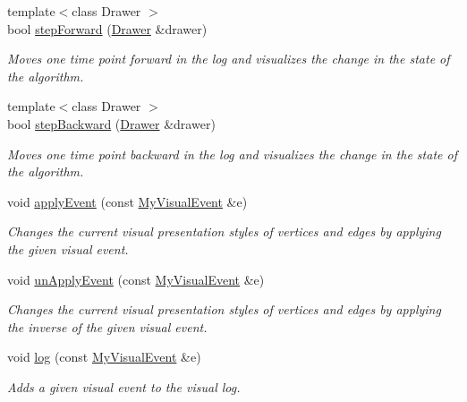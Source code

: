 \begin{DoxyCompactItemize}
\item 
{\footnotesize template$<$class Drawer $>$ }\\bool \hyperlink{structVisualLog_a544b2c0b0840710700afb2ff208e7242}{step\+Forward} (\hyperlink{structDrawer}{Drawer} \&drawer)
\begin{DoxyCompactList}\small\item\em Moves one time point forward in the log and visualizes the change in the state of the algorithm. \end{DoxyCompactList}\item 
{\footnotesize template$<$class Drawer $>$ }\\bool \hyperlink{structVisualLog_a00f3f363a706173f91d58b020fc24efa}{step\+Backward} (\hyperlink{structDrawer}{Drawer} \&drawer)
\begin{DoxyCompactList}\small\item\em Moves one time point backward in the log and visualizes the change in the state of the algorithm. \end{DoxyCompactList}\item 
void \hyperlink{structVisualLog_a765569ca8d04cae2e28818cd7b096e32}{apply\+Event} (const \hyperlink{structVisualLog_a4becdb7d1f763e250a3ace276b111bcb}{My\+Visual\+Event} \&e)
\begin{DoxyCompactList}\small\item\em Changes the current visual presentation styles of vertices and edges by applying the given visual event. \end{DoxyCompactList}\item 
void \hyperlink{structVisualLog_aa0fd9fa9aed2d3f6f5b31bd68aec161c}{un\+Apply\+Event} (const \hyperlink{structVisualLog_a4becdb7d1f763e250a3ace276b111bcb}{My\+Visual\+Event} \&e)
\begin{DoxyCompactList}\small\item\em Changes the current visual presentation styles of vertices and edges by applying the inverse of the given visual event. \end{DoxyCompactList}\item 
void \hyperlink{structVisualLog_a8cc59cd7db2c7053684340d8ce980c7b}{log} (const \hyperlink{structVisualLog_a4becdb7d1f763e250a3ace276b111bcb}{My\+Visual\+Event} \&e)
\begin{DoxyCompactList}\small\item\em Adds a given visual event to the visual log. \end{DoxyCompactList}\end{DoxyCompactItemize}
